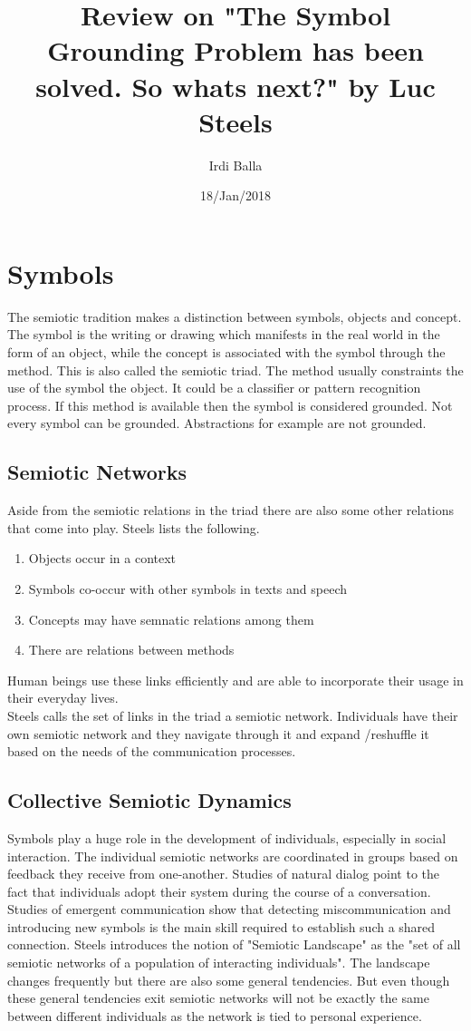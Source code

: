 \documentclass{article}
\title{Review on "The Symbol Grounding Problem has been solved. So whats next?" by Luc Steels}
\date{18/Jan/2018}
\author{Irdi Balla}
\begin{document}
	\maketitle	
	\section{Symbols}
	The semiotic tradition makes a distinction between symbols, objects and concept. The symbol is the writing or drawing which manifests in the real world in the form of an object, while the concept is associated with the symbol through the method. This is also called the semiotic triad. The method usually constraints the use of the symbol the object. It could be a classifier or pattern recognition process. If this method is available then the symbol is considered grounded. Not every symbol can be grounded. Abstractions for example are not grounded. 
	\subsection{Semiotic Networks}
	Aside from the semiotic relations in the triad there are also some other relations that come into play. Steels lists the following.
	\begin{enumerate}
		\item Objects occur in a context
		\item Symbols co-occur with other symbols in texts and speech
		\item Concepts may have semnatic relations among them
		\item There are relations between methods
	\end{enumerate}
	Human beings use these links efficiently and are able to incorporate their usage in their everyday lives. \\
	Steels calls the set of links in the triad a semiotic network. Individuals have their own semiotic network and they navigate through it and expand /reshuffle it based on the needs of the communication processes.
	\subsection{Collective Semiotic Dynamics}
	Symbols play a huge role in the development of individuals, especially in social interaction. The individual semiotic networks are coordinated in groups based on feedback they receive from one-another. Studies of natural dialog point to the fact that individuals adopt their system during the course of a conversation. Studies of emergent communication show that detecting miscommunication and introducing new symbols is the main skill required to establish such a shared connection.
	Steels introduces the notion of "Semiotic Landscape" as the "set of all semiotic networks of a population of interacting individuals". The landscape changes frequently but there are also some general tendencies. But even though these general tendencies exit semiotic networks will not be exactly the same between different individuals as the network is tied to personal experience.
\end{document}
